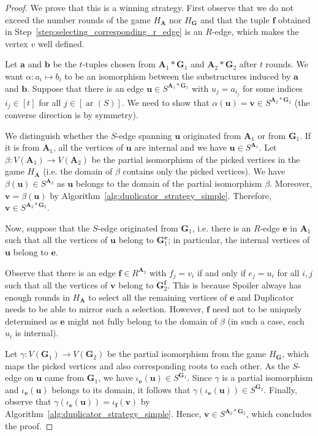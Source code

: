 \documentclass[11pt]{article}
\theoremstyle{plain}
\theoremstyle{definition}
\theoremstyle{remark}
\DeclareMathOperator\aritysym{ar}
\newcommand{\arity}[1]{{\aritysym({#1})}}
\newcommand{\str}[1]{\mathbf{#1}}
\newcommand{\tpl}[1]{{\bm{#1}}}
\begin{document}
\begin{proof}
    We prove that this is a winning strategy.
    First observe that we do not exceed the number rounds of the game $H_\str{A}$ nor $H_\str{G}$ and that the tuple $\tpl{f}$ obtained in Step~\ref{step:selecting_corresponding_r_edge} is an $R$-edge, which makes the vertex $v$ well defined. 

    Let $\tpl{a}$ and $\tpl{b}$ be the $t$-tuples chosen from $\str{A}_1*\str{G}_1$ and $\str{A}_2*\str{G}_2$ after $t$ rounds.
    We want $\alpha: a_i \mapsto b_i$ to be an isomorphism between the substructures induced by $\tpl{a}$ and $\tpl{b}$.
    Suppose that there is an edge $\tpl{u} \in S^{\str{A}_1*\str{G}_1}$ with $u_j = a_{i_j}$ for some indices $i_j \in [t]$ for all $j \in [\arity{S}]$.
    We need to show that $\alpha(\tpl{u}) = \tpl{v} \in S^{\str{A}_2*\str{G}_2}$ (the converse direction is by symmetry).
        
    We distinguish whether the $S$-edge spanning $\tpl{u}$ originated from $\str{A}_1$ or from $\str{G}_1$.
    If it is from $\str{A}_1$, all the vertices of $\tpl{u}$ are internal and we have $\tpl{u} \in S^{\str{A}_1}$.
    Let $\beta: V(\str{A}_1) \to V(\str{A}_2)$ be the partial isomorphism of the picked vertices in the game $H_\str{A}$ (i.e. the domain of $\beta$ contains only the picked vertices).
    We have $\beta(\tpl{u}) \in S^{\str{A}_2}$ as $\tpl{u}$ belongs to the domain of the partial isomorphism $\beta$.
    Moreover, $\tpl{v} = \beta(\tpl{u})$ by Algorithm~\ref{alg:duplicator_strategy_simple}.
    Therefore, $\tpl{v} \in S^{\str{A}_2*\str{G}_2}$.
    
    Now, suppose that the $S$-edge originated from $\str{G}_1$, i.e. there is an $R$-edge $\tpl{e}$ in $\str{A}_1$ such that all the vertices of $\tpl{u}$ belong to $\str{G}^\tpl{e}_1$; in particular, the internal vertices of $\tpl{u}$ belong to $\tpl{e}$.
    
    Observe that there is an edge $\tpl{f} \in R^{\str{A}_2}$ with $f_j = v_i$ if and only if $e_j = u_i$ for all $i,j$ such that all the vertices of $\tpl{v}$ belong to $\str{G}^\tpl{f}_2$.
    This is because Spoiler always has enough rounds in $H_\str{A}$ to select all the remaining vertices of $\tpl{e}$ and Duplicator needs to be able to mirror such a selection.
    However, $\tpl{f}$ need not to be uniquely determined as $\tpl{e}$ might not fully belong to the domain of $\beta$ (in such a case, each $u_i$ is internal).
    
    Let $\gamma: V(\str{G}_1) \to V(\str{G}_2)$ be the partial isomorphism from the game $H_\str{G}$, which maps the picked vertices and also corresponding roots to each other.
    As the $S$-edge on $\tpl{u}$ came from $\str{G}_1$, we have $\iota_\tpl{e}(\tpl{u}) \in S^{\str{G}_1}$.
    Since $\gamma$ is a partial isomorphism and $\iota_\tpl{e}(\tpl{u})$ belongs to its domain, it follows that $\gamma(\iota_\tpl{e}(\tpl{u})) \in S^{\str{G}_2}$.
    Finally, observe that $\gamma(\iota_\tpl{e}(\tpl{u})) = \iota_\tpl{f}(\tpl{v})$ by Algorithm~\ref{alg:duplicator_strategy_simple}.
    Hence, $\tpl{v} \in S^{\str{A}_2*\str{G}_2}$, which concludes the proof.
\end{proof}
\end{document}
